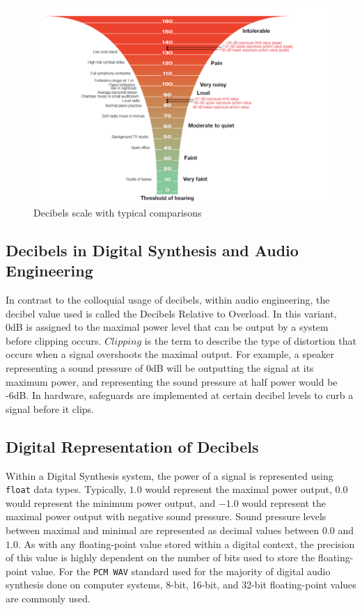 \documentclass[a4paper,12pt]{report}
\begin{document}
\begin{figure}
    \centering
    \includegraphics[width=36em]{DecibelsScale.png}
    \caption{Decibels scale with typical comparisons}
    \label{fig:decibelsscale}
\end{figure}

\subsection{Decibels in Digital Synthesis and Audio Engineering}
\label{subsec:decibelindigitalsynthesis}
In contrast to the colloquial usage of decibels, within audio engineering, the decibel value used is called the Decibels Relative to Overload.  In this variant, 0dB is assigned to the maximal power level that can be output by a system before clipping occurs. $Clipping$ is the term to describe the type of distortion that occurs when a signal overshoots the maximal output. For example, a speaker representing a sound pressure of 0dB will be outputting the signal at its maximum power, and representing the sound pressure at half power would be -6dB. In hardware, safeguards are implemented at certain decibel levels to curb a signal before it clips.

\subsection{Digital Representation of Decibels}
\label{subsec:digitalrepdecibels}
Within a Digital Synthesis system, the power of a signal is represented using \texttt{float} data types. Typically, $1.0$ would represent the maximal power output, $0.0$ would represent the minimum power output, and $-1.0$ would represent the maximal power output with negative sound pressure. Sound pressure levels between maximal and minimal are represented as decimal values between $0.0$ and $1.0$. As with any floating-point value stored within a digital context, the precision of this value is highly dependent on the number of bits used to store the floating-point value. For the \texttt{PCM\ \-WAV} standard used for the majority of digital audio synthesis done on computer systems, 8-bit, 16-bit, and 32-bit floating-point values are commonly used.
\end{document}
